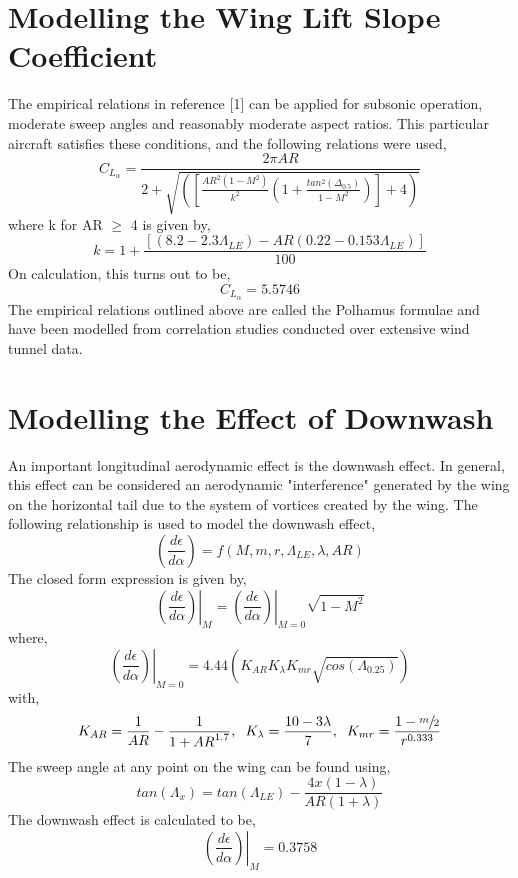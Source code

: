 \documentclass[letterpaper,12pt]{article}
\begin{document}
\section{Modelling the Wing Lift Slope Coefficient}
The empirical relations in reference [1] can be applied for subsonic operation, moderate sweep angles and reasonably moderate aspect ratios. This particular aircraft satisfies these conditions, and the following relations were used, 
\begin{equation*}
C_{L_{\alpha}} = \frac{2\pi AR}{2+\sqrt{\left(\left[\frac{AR^2(1-M^2)}{k^2}\left(1+\frac{tan^2(\Delta_{0.5})}{1-M^2}\right)\right] + 4\right)}}
\end{equation*}
where k for AR $\geq$ 4 is given by,
\begin{equation*}
k = 1 + \frac{[(8.2-2.3\Lambda_{LE}) - AR(0.22 - 0.153\Lambda_{LE})]}{100}
\end{equation*}
On calculation, this turns out to be,
\begin{equation*}
C_{L_\alpha} = 5.5746
\end{equation*}
The empirical relations outlined above are called the Polhamus formulae and have been modelled from correlation studies conducted over extensive wind tunnel data.
\section{Modelling the Effect of Downwash}
An important longitudinal aerodynamic effect is the downwash effect. In general, this effect can be considered an aerodynamic "interference" generated by the wing on the horizontal tail due to the system of vortices created by the wing.\newline \break
The following relationship is used to model the downwash effect,
\begin{equation*}
\left(\frac{d\epsilon}{d\alpha}\right) = f(M,m,r,\Lambda_{LE},\lambda,AR)
\end{equation*}
The closed form expression is given by,
\begin{equation*}
\left.\left(\frac{d\epsilon}{d\alpha}\right)\right\vert_{M} = \left.\left(\frac{d\epsilon}{d\alpha}\right)\right\vert_{M = 0} \sqrt{1 - M^2}
\end{equation*}
where,
\begin{equation*}
\left.\left(\frac{d\epsilon}{d\alpha}\right)\right\vert_{M = 0} = 4.44 \left(K_{AR}K_{\lambda}K_{mr}\sqrt{cos(\Lambda_{0.25})}\right)
\end{equation*}
with,
\begin{equation*}
K_{AR} = \frac{1}{AR} - \frac{1}{1+{AR}^{1.7}},\hspace*{0.2cm} K_{\lambda} = \frac{10 - 3\lambda}{7},\hspace*{0.2cm} K_{mr} = \frac{1-\sfrac{m}{2}}{r^{0.333}}
\end{equation*}
The sweep angle at any point on the wing can be found using,
\begin{equation*}
tan(\Lambda_x) = tan(\Lambda_{LE}) - \frac{4x(1-\lambda)}{AR(1+\lambda)}
\end{equation*}
The downwash effect is calculated to be,
\begin{equation*}
\left.\left(\frac{d\epsilon}{d\alpha}\right)\right\vert_{M} = 0.3758
\end{equation*}
\end{document}
